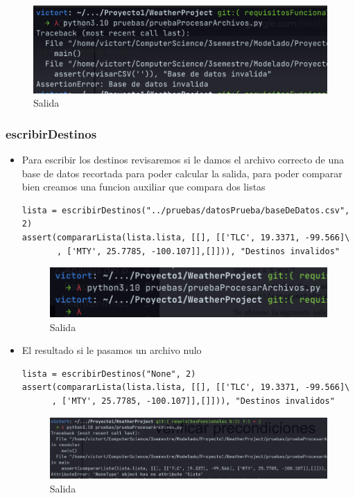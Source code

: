 \documentclass[12pt]{article}
\begin{document}
\begin{itemize}
    \begin{figure}[h!]
    \centering
    \includegraphics[scale=0.6]{pruebasPy/archivos/datosNulo.png}
    \caption{Salida}
  \end{figure}

\end{itemize}
\subsubsection{escribirDestinos}
\begin{itemize}
\item Para escribir los destinos revisaremos si le damos el archivo correcto de una base de datos recortada para poder calcular la salida, para poder comparar bien creamos una funcion auxiliar que compara dos listas
\begin{verbatim}
lista = escribirDestinos("../pruebas/datosPrueba/baseDeDatos.csv", 2)
assert(compararLista(lista.lista, [[], [['TLC', 19.3371, -99.566]\
       , ['MTY', 25.7785, -100.107]],[]])), "Destinos invalidos"
\end{verbatim}
\newpage
    \begin{figure}[h!]
    \centering
    \includegraphics[scale=0.8]{pruebasPy/archivos/bien.png}
    \caption{Salida}
  \end{figure}
\item El resultado si le pasamos un archivo nulo
\begin{verbatim}
lista = escribirDestinos("None", 2)
assert(compararLista(lista.lista, [[], [['TLC', 19.3371, -99.566]\
      , ['MTY', 25.7785, -100.107]],[]])), "Destinos invalidos"
\end{verbatim}
  
    \begin{figure}[h!]
    \centering
    \includegraphics[scale=0.4]{pruebasPy/archivos/destinosNulo.png}
    \caption{Salida}
  \end{figure}
\end{itemize}
\end{document}
